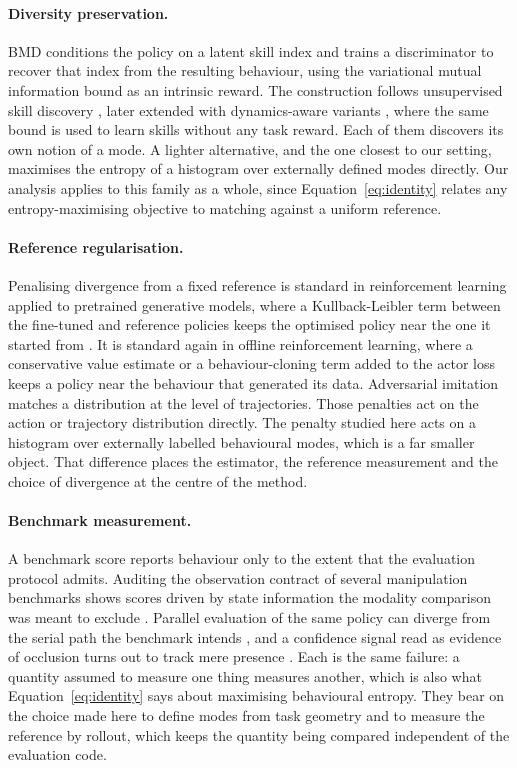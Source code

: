 \documentclass[preprint,12pt]{elsarticle}
\begin{document}
\paragraph{Diversity preservation.}
BMD \citep{longhini2026bmd} conditions the policy on a latent skill index and
trains a discriminator to recover that index from the resulting behaviour, using
the variational mutual information bound as an intrinsic reward. The construction
follows unsupervised skill discovery \citep{gregor2016vic,eysenbach2018diayn},
later extended with dynamics-aware variants \citep{sharma2020dads}, where the
same bound is used to learn skills without any task reward. Each of them
discovers its own notion of a mode. A lighter alternative, and the one closest to our setting,
maximises the entropy of a histogram over externally defined modes directly. Our
analysis applies to this family as a whole, since Equation~\ref{eq:identity}
relates any entropy-maximising objective to matching against a uniform
reference.

\paragraph{Reference regularisation.}
Penalising divergence from a fixed reference is standard in reinforcement
learning applied to pretrained generative models, where a Kullback-Leibler term
between the fine-tuned and reference policies keeps the optimised policy near
the one it started from \citep{ziegler2019finetune,stiennon2020summarize}. It
is standard again in offline reinforcement learning, where a conservative value
estimate \citep{kumar2020cql} or a behaviour-cloning term added to the actor
loss \citep{fujimoto2021td3bc} keeps a policy near the behaviour that generated
its data. Adversarial imitation \citep{ho2016gail} matches a distribution at the
level of trajectories. Those penalties act on the action or trajectory
distribution directly. The penalty studied here acts on a histogram over
externally labelled behavioural modes, which is a far smaller object. That
difference places the estimator, the reference measurement and the choice of
divergence at the centre of the method.

\paragraph{Benchmark measurement.}
A benchmark score reports behaviour only to the extent that the evaluation
protocol admits. Auditing the observation contract of several manipulation
benchmarks shows scores driven by state information the modality comparison was
meant to exclude \citep{he2026contract}. Parallel evaluation of the same policy
can diverge from the serial path the benchmark intends \citep{he2026fidelity},
and a confidence signal read as evidence of occlusion turns out to track mere
presence \citep{he2026detector}. Each is the same failure: a quantity assumed to
measure one thing measures another, which is also what
Equation~\ref{eq:identity} says about maximising behavioural entropy. They
bear on the choice made here to define modes from task geometry and to measure
the reference by rollout, which keeps the quantity being compared independent
of the evaluation code.
\end{document}
